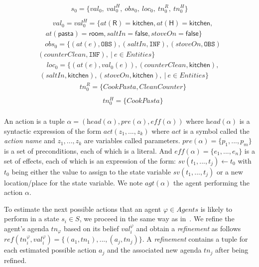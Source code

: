 {\small
\noindent
\begin{multline*}
s_0 = \{val_0, ~val^H_0, ~obs_0, ~loc_0, ~tn^R_0, ~tn^H_0\} \\ \quad
\end{multline*}
\bigvspace
\begin{multline*}
\quad val_0 = val^H_0 = \{at(\textsf{R}) = \textsf{kitchen}, at(\textsf{H}) = \textsf{kitchen},\\ 
at(\textsf{pasta}) = \textsf{room}, saltIn = \textsf{false}, stoveOn=\textsf{false} \}
\end{multline*}
\smallvspace
\begin{multline*}
\quad obs_0=\{ (at(e),\texttt{OBS}),
(saltIn,\texttt{INF}),
(stoveOn,\texttt{OBS})\\
(counterClean,\texttt{INF}),
~|~ e \in Entities \}
\end{multline*}
\smallvspace
\begin{multline*}
\quad loc_0=\{ (at(e),val_0(e)),
(counterClean,\textsf{kitchen}),\\
(saltIn,\textsf{kitchen}),
(stoveOn,\textsf{kitchen}),
~|~ e \in Entities \}
\end{multline*}
\smallvspace
\begin{multline*}
\quad tn^R_0 = \{ CookPasta, CleanCounter \} \\ \quad
\end{multline*}
\bigvspace
\begin{multline*}
\quad tn^H_0 = \{ CookPasta \} \\ \quad
\end{multline*}
\smallvspace
}

An action is a tuple $\alpha = (\textit{head}(\alpha), \textit{pre}(\alpha), \textit{eff}(\alpha))$ where $\textit{head}(\alpha)$ is a syntactic expression of the form $\textit{act}(z_1, ..., z_k)$ where $act$ is a symbol called the \textit{action name} and $z_1,...,z_k$ are variables called parameters. $\textit{pre}(\alpha) = \{ p_1, ..., p_m \}$ is a set of preconditions, each of which is a literal. And $\textit{eff}(\alpha) = \{ e_1, ..., e_n \}$ is a set of effects, each of which is an expression of the form: $sv(t_1, ..., t_j) \leftarrow t_0$ with $t_0$ being either the value to assign to the state variable $sv(t_1, ..., t_j)$ or a new location/place for the state variable. We note $\textit{agt}(\alpha)$ the agent performing the action $\alpha$.

To estimate the next possible actions that an agent $\varphi \in Agents$ is likely to perform in a state $s_i \in S$, we proceed in the same way as in~\cite{buisan:hal-03684211}. We refine the agent's agenda $tn_{\varphi}$ based on its belief $val^\varphi_i$ and obtain a \textit{refinement} as follows $\textit{ref}(tn^\varphi_i, val^\varphi_i)= \{ (a_1,tn_1),...,(a_j,tn_j) \}$. 
A \textit{refinement} contains a tuple for each estimated possible action $a_j$ and the associated new agenda $tn_j$ after being refined. 

